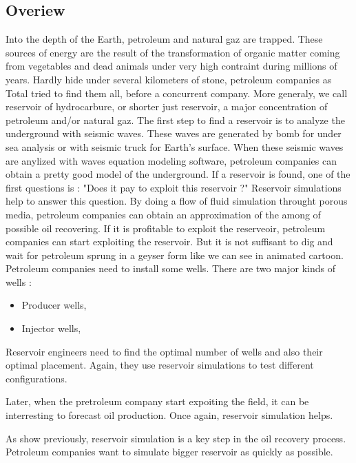 \subsection{Overiew}

Into the depth of the Earth, petroleum and natural gaz are trapped.
%
These sources of energy are the result of the transformation of organic matter coming from vegetables and dead animals under very high contraint during millions of years.
%
Hardly hide under several kilometers of stone, petroleum companies as Total tried to find them all, before a concurrent company. 
%
More generaly, we call reservoir of hydrocarbure, or shorter just reservoir, a major concentration of petroleum and/or natural gaz.
%
The first step to find a reservoir is to analyze the underground with seismic waves.
%
These waves are generated by bomb for under sea analysis or with seismic truck for Earth's surface.
%
When these seismic waves are anylized with waves equation modeling software, petroleum companies can obtain a pretty good model of the underground.
%
If a reservoir is found, one of the first questions is : "Does it pay to exploit this reservoir ?"
%
Reservoir simulations help to answer this question.
%
By doing a flow of fluid simulation throught porous media, petroleum companies can obtain an approximation of the among of possible oil recovering.
%
If it is profitable to exploit the reserveoir, petroleum companies can start exploiting the reservoir.
%
But it is not suffisant to dig and wait for petroleum sprung in a geyser form like we can see in animated cartoon.
%
Petroleum companies need to install some wells.
%
There are two major kinds of wells :
%
\begin{itemize}
  \item Producer wells,
  \item Injector wells,
\end{itemize}
%
Reservoir engineers need to find the optimal number of wells and also their optimal placement.
%
Again, they use reservoir simulations to test different configurations.

Later, when the pretroleum company start expoiting the field, it can be interresting to forecast oil production.
%
Once again, reservoir simulation helps.


As show previously, reservoir simulation is a key step in the oil recovery process.
%
Petroleum companies want to simulate bigger reservoir as quickly as possible.
